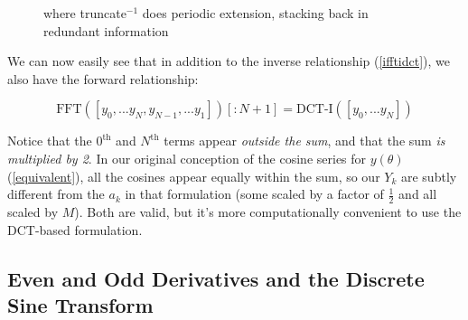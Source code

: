 \documentclass[10pt]{article}
\begin{document}
\begin{figure}[h!]
\begin{center}
\begin{minipage}{0.5\textwidth}
\centering
{}
\end{minipage}
\begin{minipage}{0.3\textwidth}\raggedright where truncate$^{-1}$ does periodic extension, stacking back in redundant information\end{minipage}
\end{center}
\end{figure}

We can now easily see that in addition to the inverse relationship (\autoref{ifftidct}), we also have the forward relationship:

$$\text{FFT}([y_0, ... y_N, y_{N-1}, ... y_1])[:\!N+1] = \text{DCT-I}([y_0, ... y_N])$$

Notice that the $0^\text{th}$ and $N^\text{th}$ terms appear \textit{outside the sum}, and that the sum \textit{is multiplied by 2}. In our original conception of the cosine series for $y(\theta)$ (\autoref{equivalent}), all the cosines appear equally within the sum, so our $Y_k$ are subtly different from the $a_k$ in that formulation (some scaled by a factor of $\frac{1}{2}$ and all scaled by $M$). Both are valid, but it's more computationally convenient to use the DCT-based formulation.

\subsection{Even and Odd Derivatives and the Discrete Sine Transform}\label{evenodd}
\end{document}
